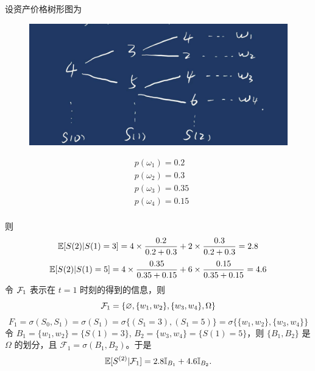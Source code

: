\begin{example}
设资产价格树形图为

\begin{minipage}{0.5\textwidth}
    \begin{figure}[H]
        \centering
        \includegraphics[width=\textwidth]{figures/exa_p149.jpg} %
    \end{figure}
\end{minipage}
\begin{minipage}{0.5\textwidth}
    \[
    \begin{aligned}
        &p(\omega_1)=0.2\\
			&p(\omega_2)=0.3\\
       &p(\omega_3)=0.35\\
&p(\omega_4)=0.15\\
    \end{aligned}
    \]
\end{minipage}
\end{example}
则
\[
\mathbb E[S(2)|S(1)=3] = 4 \times \frac{0.2}{0.2+0.3} + 2 \times \frac{0.3}{0.2+0.3} = 2.8
\]
\[
\mathbb E[S(2)|S(1)=5] = 4 \times \frac{0.35}{0.35+0.15} + 6 \times \frac{0.15}{0.35+0.15} = 4.6
\]
令 \( \mathcal{F}_1 \) 表示在 \( t=1 \) 时刻的得到的信息，则
\[
\mathcal{F}_1 = \{\varnothing, \{w_1, w_2\}, \{w_3, w_4\}, \Omega\}
\]
\[
F_1 = \sigma(S_0, S_1) = \sigma(S_1) = \sigma\{(S_1 = 3), (S_1 = 5)\} = \sigma\{\{w_1, w_2\}, \{w_3, w_4\}\}
\]
令 \( B_1 = \{w_1, w_2\} = \{S(1) = 3\} \), \( B_2 = \{w_3, w_4\} = \{S(1) = 5\} \)，则 \(\{B_1, B_2\}\) 是 \(\Omega\) 的划分，且 \(\mathcal{F}_1 = \sigma(B_1, B_2)\)。于是
\[
\mathbb E[S^{(2)}|\mathcal{F}_1] = 2.8\mathbb{I}_{B_1} + 4.6\mathbb{I}_{B_2}.
\]

